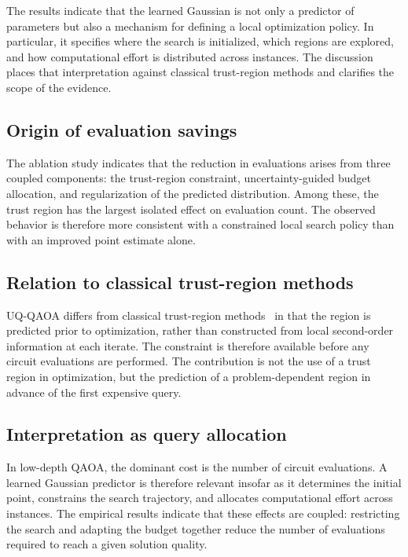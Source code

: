 \documentclass[aps,prx,reprint,superscriptaddress,longbibliography]{revtex4-2}
\newcommand{\QAOA}{\textnormal{\textsc{QAOA}}}
\newcommand{\UQQAOA}{\textnormal{\textsc{UQ-QAOA}}}
\begin{document}
The results indicate that the learned Gaussian is not only a predictor
of parameters but also a mechanism for defining a local
optimization policy. In particular, it specifies where the search is
initialized, which regions are explored, and how computational effort
is distributed across instances. The discussion places that
interpretation against classical trust-region methods and clarifies the
scope of the evidence.

\subsection{Origin of evaluation savings}

The ablation study indicates that the reduction in evaluations arises
from three coupled components: the trust-region constraint,
uncertainty-guided budget allocation, and regularization of the
predicted distribution. Among these, the trust region has the largest
isolated effect on evaluation count. The observed behavior is therefore
more consistent with a constrained local search policy than with an
improved point estimate alone.

\subsection{Relation to classical trust-region methods}

\UQQAOA{} differs from classical trust-region methods~\cite{conn2000}
in that the region is predicted prior to optimization, rather than
constructed from local second-order information at each iterate. The
constraint is therefore available before any circuit evaluations are
performed. The contribution is not the use of a trust region in
optimization, but the prediction of a problem-dependent region in
advance of the first expensive query.

\subsection{Interpretation as query allocation}

In low-depth \QAOA{}, the dominant cost is the number of circuit
evaluations. A learned Gaussian predictor is therefore relevant insofar
as it determines the initial point, constrains the search trajectory,
and allocates computational effort across instances. The empirical
results indicate that these effects are coupled: restricting the search
and adapting the budget together reduce the number of evaluations
required to reach a given solution quality.
\end{document}
